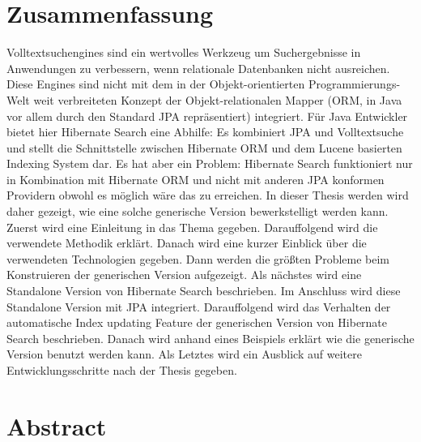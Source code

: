 \section*{Zusammenfassung}
Volltextsuchengines sind ein wertvolles Werkzeug um Suchergebnisse in Anwendungen zu verbessern, wenn relationale Datenbanken nicht ausreichen. Diese Engines sind nicht mit dem in der Objekt-orientierten Programmierungs-Welt weit verbreiteten Konzept der Objekt-relationalen Mapper (ORM, in Java vor allem durch den Standard JPA repräsentiert) integriert. Für Java Entwickler bietet hier Hibernate Search eine Abhilfe: Es kombiniert JPA und Volltextsuche und stellt die Schnittstelle zwischen Hibernate ORM und dem Lucene basierten Indexing System dar. Es hat aber ein Problem: Hibernate Search funktioniert nur in Kombination mit Hibernate ORM und nicht mit anderen JPA konformen Providern obwohl es möglich wäre das zu erreichen. In dieser Thesis werden wird daher gezeigt, wie eine solche generische Version bewerkstelligt werden kann. Zuerst wird eine Einleitung in das Thema gegeben. Darauffolgend wird die verwendete Methodik erklärt. Danach wird eine kurzer Einblick über die verwendeten Technologien gegeben. Dann werden die größten Probleme beim Konstruieren der generischen Version aufgezeigt. Als nächstes wird eine Standalone Version von Hibernate Search beschrieben. Im Anschluss wird diese Standalone Version mit JPA integriert. Darauffolgend wird das Verhalten der automatische Index updating Feature der generischen Version von Hibernate Search beschrieben. Danach wird anhand eines Beispiels erklärt wie die generische Version benutzt werden kann. Als Letztes wird ein Ausblick auf weitere Entwicklungsschritte nach der Thesis gegeben.

\pagebreak

\section*{Abstract}

